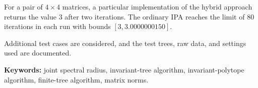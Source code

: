 For a pair of $4\times4$ matrices, a particular implementation of the hybrid approach returns the value $3$ after two iterations.
The ordinary IPA reaches the limit of $80$ iterations in each run with bounds $[3,3.0000000150]$.

Additional test cases are considered, and the test trees, raw data, and settings used are documented.

\smallskip
\textbf{Keywords:} joint spectral radius, invariant-tree algorithm, invariant-polytope algorithm, finite-tree algorithm, matrix norms.
